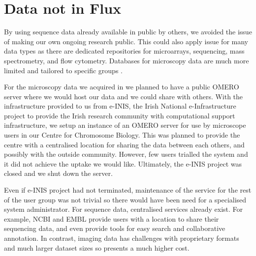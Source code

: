 \section{Data not in Flux}

By using sequence data already available in public by others,
we avoided the issue
of making our own ongoing research public.  This could also apply
issue for many data types as there are dedicated repositories for
microarrays, sequencing, mass spectrometry, and flow cytometry.
Databases for microscopy data are much more limited and tailored to
specific groups .

For the microscopy data we acquired in  we planned
to have a public OMERO server where we would host our data and we
could share with others.  With the infrastructure provided to us from
e-INIS, the Irish National e-Infrastructure project to provide the
Irish research community with computational support
infrastructure,  we setup an instance of an OMERO server for use by
microscope users in our Centre for Chromosome Biology.
This was planned to provide the
centre with a centralised location for sharing the data between each
others, and possibly with the outside community.  However, few users
trialled the system and it did not achieve the uptake we would like.
Ultimately, the e-INIS project was closed and we
shut down the server.

Even if e-INIS project had not terminated, maintenance of the service
for the rest of the user group was not trivial so there would have been need
for a specialised system administrator.  For sequence data,
centralised services already exist.
For example, NCBI and EMBL provide users with a
location to share their sequencing data, and even provide tools for
easy search and collaborative annotation.  In contrast, imaging data
has challenges with proprietary formats and much larger dataset sizes
so presents a much higher cost.




